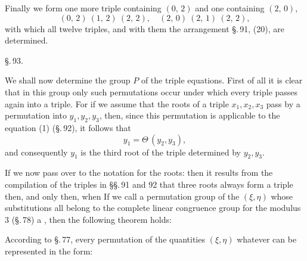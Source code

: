 
Finally we form one more triple containing $(0,\,2)$ and one
containing $(2,\,0)$,
\[
(0,\,2)\ (1,\,2)\ (2,\,2), \quad (2,\,0)\ (2,\,1)\ (2,\,2),
\]
with which all twelve triples, and with them the arrangement \S.\,91, (20),
are determined.

\S.\,93.


We shall now determine the  group $P$ of the triple
equations. First of all it is clear that in this group only
such permutations occur under which every triple passes again
into a triple. For if we assume that the roots of a
triple $x_1, x_2, x_3$ pass by a permutation into $y_1, y_2, y_3$,
then, since this permutation is applicable to the equation (1) (\S.\,92),
it follows that
\[
y_1 = \Theta\,(y_2, y_3),
\]
and consequently $y_1$ is the third root of the triple determined
by $y_2, y_3$.

If we now pass over to the notation for the roots:
then it results from the compilation of the triples in
§§.\,91 and 92 that three roots
always form a triple then, and only then, when
If we call a permutation group of the $(\xi, \eta)$ whose substitutions
all belong to the complete linear congruence group for
the modulus 3 (\S.\,78) a , then the following theorem
holds:


According to \S.\,77, every permutation of the quantities $(\xi, \eta)$
whatever can be represented in the form:
